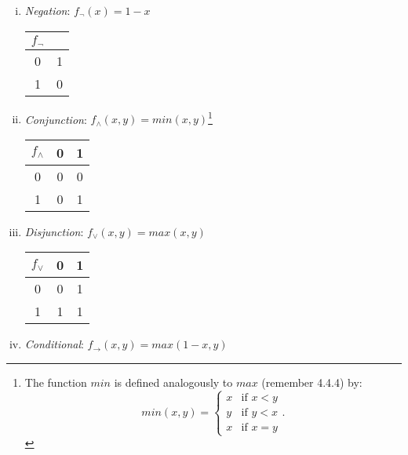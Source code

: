 \begin{enumerate}[\thesection.1]
\begin{enumerate}[(i)]
			\item \emph{Negation}: $f_\neg(x)=1-x$
			
			\begin{center}
			\begin{tabular}{c | c}

			$f_\neg$ & \\\hline

			0 & 1\\

			1 & 0

			\end{tabular}
			\end{center}
			
			\item \emph{Conjunction}: $f_\land(x,y)=min(x,y)$\footnote{The function $min$ is defined analogously to $max$ (remember 4.4.4) by: \[min(x,y)=\begin{cases}x & \text{if }x<y\\y&\text{if }y<x\\ x & \text{if }x=y\end{cases}.\]}
		
			\begin{center}
			\begin{tabular}{c | c c}
			
			$f_\land$ & 0 & 1\\\hline
			
			0 & 0 & 0 \\
			
			1 & 0 & 1
		
			\end{tabular}
			\end{center}
			
			\item \emph{Disjunction}: $f_\lor(x,y)=max(x,y)$
			
			\begin{center}
			\begin{tabular}{c | c c}
		
			$f_\lor$ & 0 & 1\\\hline
			
			0 & 0 & 1 \\

			1 & 1 & 1
		
			\end{tabular}
			\end{center}
			
			\item \emph{Conditional}: $f_\to(x,y)=max(1-x,y)$
			

\end{enumerate}
\end{enumerate}
